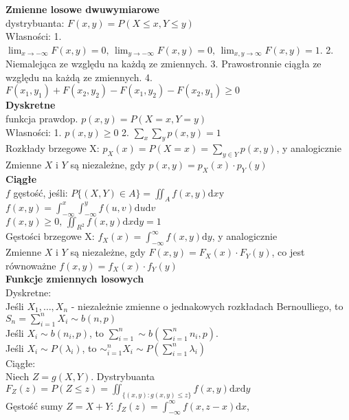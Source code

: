 \documentclass[10pt,landscape,a4paper,notitlepage]{article}
\begin{document}
\begin{multicols*}{4}
        \noindent\textbf{\large Zmienne losowe dwuwymiarowe}\\
        dystrybuanta: $F(x,y)=P(X\leq x,Y\leq y)$\\
        Własności: 
        1. $\lim_{x\rightarrow-\infty}F(x,y)=0,\,\lim_{y\rightarrow-\infty}F(x,y)=0,\,\lim_{x,y\rightarrow\infty}F(x,y)=1$.
        2. Niemalejąca ze względu na każdą ze zmiennych.
        3. Prawostronnie ciągła ze względu na każdą ze zmiennych.
        4. $F(x_1,y_1)+F(x_2,y_2)-F(x_1,y_2)-F(x_2,y_1)\geq 0$\\
        \textbf{Dyskretne}\\
        funkcja prawdop. $p(x,y)=P(X=x,Y=y)$\\
        Własności:
        1. $p(x,y)\geq 0$
        2. $\sum_x\sum_yp(x,y)=1$\\
        Rozkłady brzegowe X: $p_X(x)=P(X=x)=\sum_{y\in Y}p(x,y)$, y analogicznie\\
        Zmienne $X$ i $Y$ są niezależne, gdy $p(x,y)=p_X(x)\cdot p_Y(y)$\\
        \textbf{Ciągłe}\\
        $f$ gęstość, jeśli: 
        $P\{(X,Y)\in A\}=\iint_Af(x,y)\mathrm{d}x\mathrm{y}$\\
        $f(x,y)=\int_{-\infty}^x\int_{-\infty}^yf(u,v)\mathrm{d}u\mathrm{d}v$\\
        $f(x,y)\geq 0,\,\iint_{R^2}f(x,y)\mathrm{d}x\mathrm{d}y=1$\\
        Gęstości brzegowe X: $f_X(x)=\int_{-\infty}^{\infty}f(x,y)\mathrm{d}y$, y analogicznie\\
        Zmienne $X$ i $Y$ są niezależne, gdy $F(x,y)=F_X(x)\cdot F_Y(y)$, co jest równoważne $f(x,y)=f_X(x)\cdot f_Y(y)$\\
        \textbf{Funkcje zmiennych losowych}\\
        Dyskretne:\\
        Jeśli $X_1,\ldots,X_n$ - niezależnie zmienne o jednakowych rozkładach Bernoulliego, to $S_n=\sum_{i=1}^nX_i\sim b(n,p)$\\
        Jeśli $X_i\sim b(n_i,p)$, to $\sum_{i=1}^n\sim b(\sum_{i=1}^nn_i,p)$.\\
        Jeśli $X_i\sim P(\lambda_i)$, to $\sim_{i=1}^nX_i\sim P(\sum_{i=1}^n\lambda_i)$\\
        Ciągłe:\\
        Niech $Z=g(X,Y)$. Dystrybuanta $F_Z(z)=P(Z\leq z)=\iint_{\{(x,y):g(x,y)\leq z\}}f(x,y)\mathrm{d}x\mathrm{d}y$\\
        Gęstość sumy $Z=X+Y:\,f_Z(z)=\int_{-\infty}^{\infty}f(x,z-x)\mathrm{d}x$, 

\end{multicols*}
\end{document}
